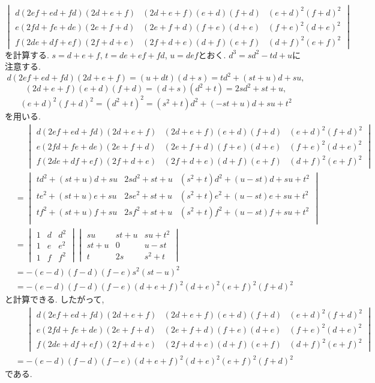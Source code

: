 \begin{eg}
\[\begin{vmatrix}
d(2ef+ed+fd)(2d+e+f)&(2d+e+f)(e+d)(f+d)&(e+d)^2(f+d)^2\\
e(2fd+fe+de)(2e+f+d)&(2e+f+d)(f+e)(d+e)&(f+e)^2(d+e)^2\\
f(2de+df+ef)(2f+d+e)&(2f+d+e)(d+f)(e+f)&(d+f)^2(e+f)^2
\end{vmatrix}\]
を計算する.
$s=d+e+f$, $t=de+ef+fd$, $u=def$とおく.
$d^3=sd^2-td+u$に注意する.
\[d(2ef+ed+fd)(2d+e+f)=(u+dt)(d+s)=td^2+(st+u)d+su,\]
\[(2d+e+f)(e+d)(f+d)=(d+s)(d^2+t)=2sd^2+st+u,\]
\[(e+d)^2(f+d)^2=(d^2+t)^2=(s^2+t)d^2+(-st+u)d+su+t^2\]
を用いる.
\begin{align*}
&\phantom{{}={}}\begin{vmatrix}
d(2ef+ed+fd)(2d+e+f)&(2d+e+f)(e+d)(f+d)&(e+d)^2(f+d)^2\\
e(2fd+fe+de)(2e+f+d)&(2e+f+d)(f+e)(d+e)&(f+e)^2(d+e)^2\\
f(2de+df+ef)(2f+d+e)&(2f+d+e)(d+f)(e+f)&(d+f)^2(e+f)^2
\end{vmatrix}\\
&=\begin{vmatrix}
td^2+(st+u)d+su&2sd^2+st+u&(s^2+t)d^2+(u-st)d+su+t^2\\
te^2+(st+u)e+su&2se^2+st+u&(s^2+t)e^2+(u-st)e+su+t^2\\
tf^2+(st+u)f+su&2sf^2+st+u&(s^2+t)f^2+(u-st)f+su+t^2\\
\end{vmatrix}\\
&=\begin{vmatrix}
1&d&d^2\\
1&e&e^2\\
1&f&f^2
\end{vmatrix}
\begin{vmatrix}
su&st+u&su+t^2\\
st+u&0&u-st\\
t&2s&s^2+t
\end{vmatrix}\\
&=-(e-d)(f-d)(f-e)s^2(st-u)^2\\
&=-(e-d)(f-d)(f-e)(d+e+f)^2(d+e)^2(e+f)^2(f+d)^2
\end{align*}
と計算できる.
したがって,
\begin{align*}
&\phantom{{}={}}\begin{vmatrix}
d(2ef+ed+fd)(2d+e+f)&(2d+e+f)(e+d)(f+d)&(e+d)^2(f+d)^2\\
e(2fd+fe+de)(2e+f+d)&(2e+f+d)(f+e)(d+e)&(f+e)^2(d+e)^2\\
f(2de+df+ef)(2f+d+e)&(2f+d+e)(d+f)(e+f)&(d+f)^2(e+f)^2
\end{vmatrix}\\
&=-(e-d)(f-d)(f-e)(d+e+f)^2(d+e)^2(e+f)^2(f+d)^2
\end{align*}
である.
\end{eg}
%
%
